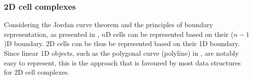 \subsubsection{2D cell complexes}

Considering the Jordan curve theorem \citep{Jordan87} and the principles of boundary representation, as presented in , $n$D cells can be represented based on their ($n-1$)D boundary.
2D cells can be thus be represented based on their 1D boundary.
Since linear 1D objects, such as the polygonal curve (polyline) in , are notably easy to represent, this is the approach that is favoured by most data structures for 2D cell complexes.
